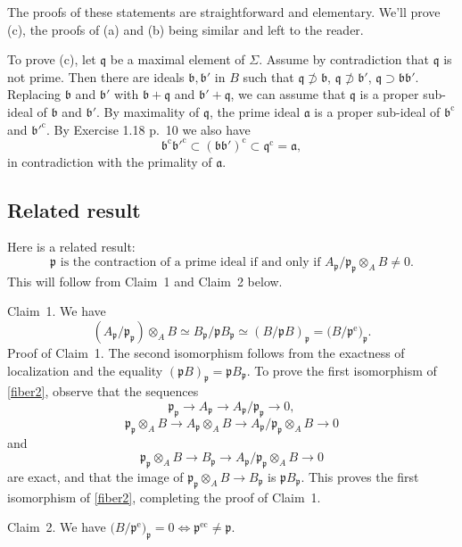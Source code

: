 \documentclass[parskip=half,fontsize=12pt]{scrartcl}%
\newcommand{\oo}{\operatorname}\newcommand{\ooo}{\operatorname*}
\newcommand{\mf}{\mathfrak}
\newcommand{\aaa}{\mf a}
\newcommand{\bbb}{\mf b}
\newcommand{\ppp}{\mf p}
\newcommand{\qqq}{\mf q}
\begin{document}
The proofs of these statements are straightforward and elementary. We'll prove (c), the proofs of (a) and (b) being similar and left to the reader.

To prove (c), let $\qqq$ be a maximal element of $\Sigma$. Assume by contradiction that $\qqq$ is not prime. Then there are ideals $\mf{b,b}'$ in $B$ such that $\qqq\not\supset\bbb$, $\qqq\not\supset\bbb'$, $\qqq\supset\mf{bb}'$. Replacing $\bbb$ and $\bbb'$ with $\bbb+\qqq$ and $\bbb'+\qqq$, we can assume that $\qqq$ is a proper sub-ideal of $\bbb$ and $\bbb'$. By maximality of $\qqq$, the prime ideal $\aaa$ is a proper sub-ideal of $\bbb^{\oo c}$ and $\bbb'^{\oo c}$. By Exercise 1.18 p.~10 we also have 
$$
\bbb^{\oo c}\bbb'^{\oo c}\subset(\mf{bb}')^{\oo c}\subset\qqq^{\oo c}=\aaa,
$$ 
in contradiction with the primality of $\aaa$.

\subsection{Related result}\label{res}%

Here is a related result:
\begin{equation}\label{fiber1}
\ppp\text{ is the contraction of a prime ideal if and only if }A_\ppp/\ppp_\ppp\otimes_AB\ne0.
\end{equation}
This will follow from Claim~1 and Claim~2 below.

Claim~1. We have 
\begin{equation}\label{fiber2}
(A_\ppp/\ppp_\ppp)\otimes_AB\simeq B_\ppp/\ppp B_\ppp\simeq(B/\ppp B)_\ppp=\big(B/\ppp^{\oo e}\big)_\ppp.%
\end{equation} 
Proof of Claim~1. The second isomorphism follows from the exactness of localization and the equality $(\ppp B)_\ppp=\ppp B_\ppp$. %
To prove the first isomorphism of \eqref{fiber2}, observe that the sequences 
$$
\ppp_\ppp\to A_\ppp\to A_\ppp/\ppp_\ppp\to0,
$$ 
$$
\ppp_\ppp\otimes_AB\to A_\ppp\otimes_AB\to A_\ppp/\ppp_\ppp\otimes_AB\to0
$$ 
and 
$$
\ppp_\ppp\otimes_AB\to B_\ppp\to A_\ppp/\ppp_\ppp\otimes_AB\to0
$$ 
are exact, and that the image of $\ppp_\ppp\otimes_AB\to B_\ppp$ is $\ppp B_\ppp$. This proves the first isomorphism of \eqref{fiber2}, completing the proof of Claim~1. 

Claim~2. We have $\big(B/\ppp^{\oo e}\big)_\ppp=0\iff\ppp^{\oo{ec}}\ne\ppp$. 
\end{document}
